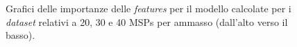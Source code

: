 \begin{figure}[H]
\centering
{}\\

\\

\caption{Grafici delle importanze delle \textit{features} per il modello calcolate per i \textit{dataset} relativi a 20, 30 e 40 MSPs per ammasso (dall'alto verso il basso).}
\label{fig:importanze1}
\end{figure}


